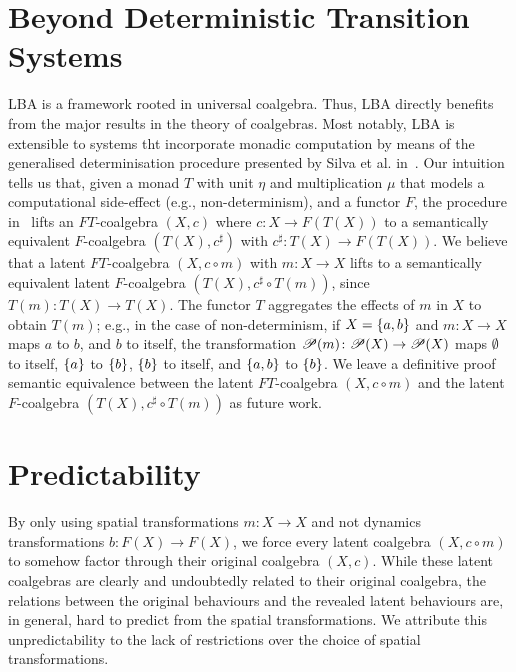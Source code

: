 \section{Beyond Deterministic Transition Systems}
LBA is a framework rooted in universal coalgebra. 
Thus, LBA directly benefits from the major results in the theory of coalgebras. Most notably, LBA is extensible to systems tht incorporate monadic computation by means of the generalised determinisation procedure presented by Silva et al. in~\cite{GeneralisingDetermination}. 
Our intuition tells us that, given a monad $T$ with unit $\eta$ and multiplication $\mu$ that models a computational side-effect (e.g., non-determinism), and a functor $F$, the procedure in~\cite{GeneralisingDetermination} lifts an $FT$-coalgebra $(X,c)$ where $c\colon X\rightarrow F(T(X))$ to a semantically equivalent $F$-coalgebra $(T(X),c^\sharp)$ with $c^\sharp\colon T(X)\rightarrow F(T(X))$. We believe that a latent $FT$-coalgebra $(X,c\circ m)$ with $m\colon X\rightarrow X$ lifts to a semantically equivalent latent $F$-coalgebra $(T(X),c^\sharp\circ T(m))$, since $T(m)\colon T(X)\rightarrow T(X)$. 
The functor $T$ aggregates the effects of $m$ in $X$ to obtain $T(m)$; e.g., in the case of non-determinism, if $X=\left\{a,b\right\}$ and $m\colon X\rightarrow X$ maps $a$ to $b$, and $b$ to itself, the transformation ${{\mathscr{P}}\!\left({m}\right)}\colon {{\mathscr{P}}\!\left({X}\right)}\rightarrow {{\mathscr{P}}\!\left({X}\right)}$ maps $\emptyset$ to itself, $\left\{a\right\}$ to $\left\{b\right\}$, $\left\{b\right\}$ to itself, and $\left\{a,b\right\}$ to $\left\{b\right\}$. We leave a definitive proof semantic equivalence between the latent $FT$-coalgebra $(X,c\circ m)$ and the latent $F$-coalgebra $(T(X),c^\sharp\circ T(m))$ as future work. %


\section{Predictability} 
By only using spatial transformations $m\colon X\rightarrow X$ and not dynamics transformations $b\colon F(X)\rightarrow F(X)$, we force every latent coalgebra $(X,c\circ m)$ to somehow factor through their original coalgebra $(X,c)$. While these latent coalgebras are clearly and undoubtedly related to their original coalgebra, the relations between the original behaviours and the revealed latent behaviours are, in general, hard to predict from the spatial transformations. We attribute this unpredictability to the lack of restrictions over the choice of spatial transformations. 

